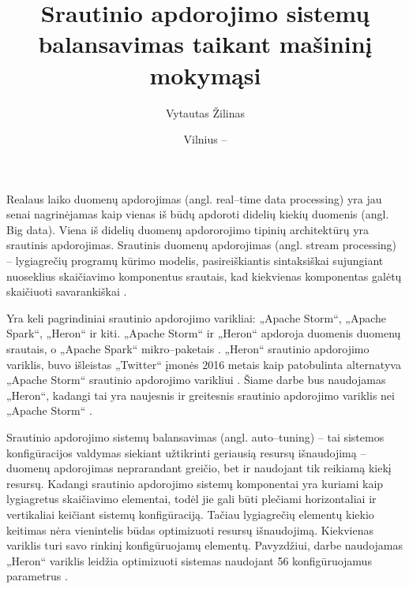\documentclass{VUMIFPSbakalaurinis}
\title{Srautinio apdorojimo sistemų balansavimas taikant mašininį mokymąsi}
\author{Vytautas Žilinas}
\date{Vilnius – \the\year}
\begin{document}
 
\maketitle

\cleardoublepage{}
\setcounter{page}{2}

\tableofcontents


Realaus laiko duomenų apdorojimas (angl. real–time data processing) yra jau senai nagrinėjamas kaip vienas iš būdų apdoroti didelių kiekių duomenis (angl. Big data). Viena iš didelių duomenų apdororojimo tipinių architektūrų yra srautinis apdorojimas. Srautinis duomenų apdorojimas (angl. stream processing) – lygiagrečių programų kūrimo modelis, pasireiškiantis sintaksiškai sujungiant nuoseklius skaičiavimo komponentus srautais, kad kiekvienas komponentas galėtų skaičiuoti savarankiškai \cite{shortstreamproc}. 

Yra keli pagrindiniai srautinio apdorojimo varikliai: „Apache Storm“, „Apache Spark“, „Heron“ ir kiti. „Apache Storm“ ir „Heron“ apdoroja duomenis duomenų srautais, o „Apache Spark“ mikro–paketais \cite{karau2015learning}. „Heron“ srautinio apdorojimo variklis, buvo išleistas „Twitter“ įmonės 2016 metais kaip patobulinta alternatyva „Apache Storm“ srautinio apdorojimo varikliui \cite{openSourcing}. Šiame darbe bus naudojamas „Heron“, kadangi tai yra naujesnis ir greitesnis srautinio apdorojimo variklis nei „Apache Storm“ \cite{twitterHeron}. 

Srautinio apdorojimo sistemų balansavimas (angl. auto–tuning) – tai sistemos konfigūracijos valdymas siekiant užtikrinti geriausią resursų išnaudojimą – duomenų apdorojimas neprarandant greičio, bet ir naudojant tik reikiamą kiekį resursų. Kadangi srautinio apdorojimo sistemų komponentai yra kuriami kaip lygiagretus skaičiavimo elementai, todėl jie gali būti plečiami horizontaliai ir vertikaliai \cite{shortstreamproc} keičiant sistemų konfigūraciją. Tačiau lygiagrečių elementų kiekio keitimas nėra vienintelis būdas optimizuoti resursų išnaudojimą. Kiekvienas variklis turi savo rinkinį konfigūruojamų elementų. Pavyzdžiui, darbe naudojamas „Heron“ variklis leidžia optimizuoti sistemas naudojant 56 konfigūruojamus parametrus \cite{configDocument}.
\end{document}
